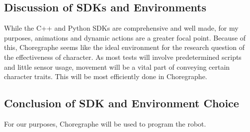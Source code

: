\documentclass[onecolumn, draftclsnofoot,10pt, compsoc]{IEEEtran}
\begin{document}
\subsection{Discussion of SDKs and Environments}
While the C++ and Python SDKs are comprehensive and well made, for my purposes, animations and dynamic actions are a greater focal point.
Because of this, Choregraphe seems like the ideal environment for the research question of the effectiveness of character.
As most tests will involve predetermined scripts and little sensor usage, movement will be a vital part of conveying certain character traits. This will be most efficiently done in Choregraphe.

\subsection{Conclusion of SDK and Environment Choice}
For our purposes, Choregraphe will be used to program the robot.










\end{document}
